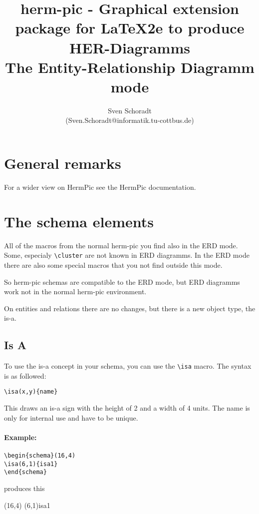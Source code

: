 \documentclass[a4paper,11pt]{article}
\author{Sven Schoradt \\ (Sven.Schoradt@informatik.tu-cottbus.de)}
\title{herm-pic - Graphical extension package for LaTeX2e to produce HER-Diagramms\\The Entity-Relationship Diagramm mode}
\begin{document}
\maketitle

\section{General remarks}

For a wider view on HermPic see the HermPic documentation.

\section{The schema elements}

All of the macros from the normal herm-pic you find also in the ERD mode.
Some, especialy \verb|\cluster| are not known in ERD diagramms. In the ERD mode there are also some special macros that you not find outside this mode.

So herm-pic schemas are compatible to the ERD mode, but ERD diagramms work not in the normal herm-pic environment.

On entities and relations there are no changes, but there is a new object type,
the is-a.

\subsection{Is A}

To use the is-a concept in your schema, you can use the \verb|\isa| macro.
The syntax is as followed:

\begin{verbatim}
\isa(x,y){name}
\end{verbatim}

This draws an is-a sign with the height of 2 and a width of 4 units.
The name is only for internal use and have to be unique.

\paragraph{Example:}

\begin{verbatim}
\begin{schema}(16,4)
\isa(6,1){isa1}
\end{schema}
\end{verbatim}

produces this

\begin{schema}(16,4)
\isa(6,1){isa1}
\end{schema}
\end{document}
